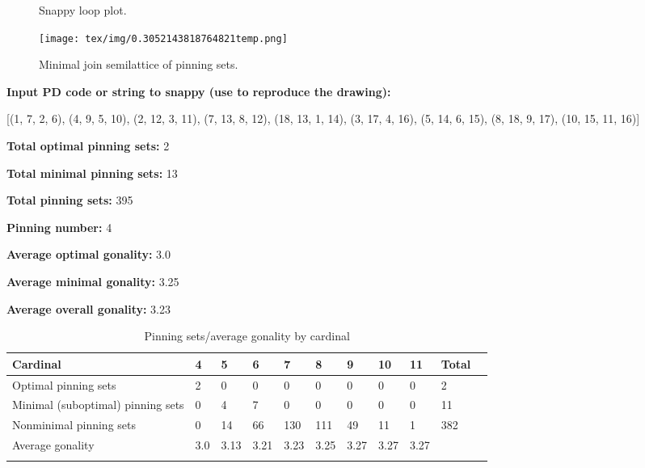 \documentclass{article}%
\begin{document}
\newpage

\begin{multicols}{2}
\begin{figure}[H]
\centering

\caption{Snappy loop plot.}
\label{fig:tex/img/0.2786945118638071temp.svg}
\end{figure}
\columnbreak

\begin{figure}[H]
\centering
\texttt{[image: tex/img/0.3052143818764821temp.png]}
\caption{Minimal join semilattice of pinning sets.}
\label{fig:tex/img/0.3052143818764821temp.png}
\end{figure}
\end{multicols}

\newpage

\begin{multicols}{2}
\noindent\textbf{Input PD code or string to snappy (use to reproduce the drawing):}

	[(1, 7, 2, 6), (4, 9, 5, 10), (2, 12, 3, 11), (7, 13, 8, 12), (18, 13, 1, 14), (3, 17, 4, 16), (5, 14, 6, 15), (8, 18, 9, 17), (10, 15, 11, 16)]


\columnbreak

\noindent\textbf{Total optimal pinning sets:} 2

\noindent\textbf{Total minimal pinning sets:} 13

\noindent\textbf{Total pinning sets:} 395

\noindent\textbf{Pinning number:} 4

\noindent\textbf{Average optimal gonality:} 3.0

\noindent\textbf{Average minimal gonality:} 3.25

\noindent\textbf{Average overall gonality:} 3.23


\end{multicols}

\begin{table}[ht]
	\caption{Pinning sets/average gonality by cardinal}
	\centering
	\renewcommand{\arraystretch}{1.5}
	\begin{tabularx}{\textwidth}{lXXXXXXXXXX}
		\toprule
			Cardinal & 4 & 5 & 6 & 7 & 8 & 9 & 10 & 11 & Total\\
			\hline
			Optimal pinning sets & 2 & 0 & 0 & 0 & 0 & 0 & 0 & 0 & 2 \\
			Minimal (suboptimal) pinning sets & 0 & 4 & 7 & 0 & 0 & 0 & 0 & 0 & 11 \\
			Nonminimal pinning sets & 0 & 14 & 66 & 130 & 111 & 49 & 11 & 1 & 382 \\
			Average gonality & 3.0 & 3.13 & 3.21 & 3.23 & 3.25 & 3.27 & 3.27 & 3.27 &  \\
		\bottomrule \\ 
	\end{tabularx}
\end{table}
\end{document}
